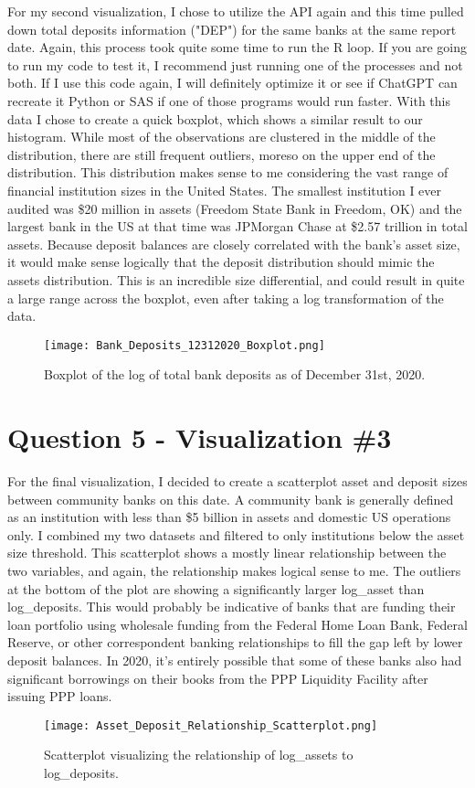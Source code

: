 \documentclass{article}
\begin{document}
For my second visualization, I chose to utilize the API again and this time pulled down total deposits information ("DEP") for the same banks at the same report date. Again, this process took quite some time to run the R loop. If you are going to run my code to test it, I recommend just running one of the processes and not both. If I use this code again, I will definitely optimize it or see if ChatGPT can recreate it Python or SAS if one of those programs would run faster. With this data I chose to create a quick boxplot, which shows a similar result to our histogram. While most of the observations are clustered in the middle of the distribution, there are still frequent outliers, moreso on the upper end of the distribution. This distribution makes sense to me considering the vast range of financial institution sizes in the United States. The smallest institution I ever audited was \$20 million in assets (Freedom State Bank in Freedom, OK) and the largest bank in the US at that time was JPMorgan Chase at \$2.57 trillion in total assets. Because deposit balances are closely correlated with the bank's asset size, it would make sense logically that the deposit distribution should mimic the assets distribution. This is an incredible size differential, and could result in quite a large range across the boxplot, even after taking a log transformation of the data.  

\begin{figure}[h]
    \centering
    \texttt{[image: Bank\_Deposits\_12312020\_Boxplot.png]}  %
    \caption{Boxplot of the log of total bank deposits as of December 31st, 2020.}
    \label{fig:your-label}
\end{figure}

\newpage
\section{Question 5 - Visualization \#3}

For the final visualization, I decided to create a scatterplot asset and deposit sizes between community banks on this date. A community bank is generally defined as an institution with less than \$5 billion in assets and domestic US operations only. I combined my two datasets and filtered to only institutions below the asset size threshold. This scatterplot shows a mostly linear relationship between the two variables, and again, the relationship makes logical sense to me. The outliers at the bottom of the plot are showing a significantly larger log\_asset than log\_deposits. This would probably be indicative of banks that are funding their loan portfolio using wholesale funding from the Federal Home Loan Bank, Federal Reserve, or other correspondent banking relationships to fill the gap left by lower deposit balances. In 2020, it's entirely possible that some of these banks also had significant borrowings on their books from the PPP Liquidity Facility after issuing PPP loans.  

\begin{figure}[h]
    \centering
    \texttt{[image: Asset\_Deposit\_Relationship\_Scatterplot.png]}  %
    \caption{Scatterplot visualizing the relationship of log\_assets to log\_deposits.}
    \label{fig:your-label}
\end{figure}
\end{document}
